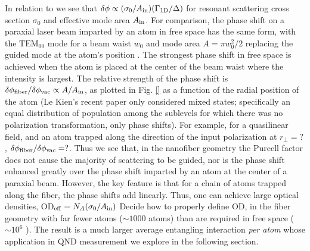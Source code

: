\documentclass[preprint,aps,pra,onecolumn]{revtex4-1} %
\newcommand{\oneD}{{\rm 1D}}
\newcommand{\vac}{{\rm vac}}
\newcommand{\inp}{{\rm in}}
\newcommand{\Ain}{A_{\rm in}}
\newcommand{\change}[1]{{\color{RoyalBlue} #1}}
\newcommand{\comment}[1]{{\color{Maroon} #1}}
\newcommand{\error}[1]{{\color{red} #1}}
\begin{document}
\change{
In relation to  we see that $\delta \phi \propto (\sigma_0/A_{\rm in}) (\Gamma_{\oneD}/\Delta)$ for resonant scattering cross section $\sigma_0$ and effective mode area $A_\inp$. For comparison, the phase shift on a paraxial laser beam imparted by an atom in free space has the same form, with the $\mathrm{TEM}_{00}$ mode for a beam waist $w_0$ and mode area $A= \pi w_0^2/2$ replacing the guided mode at the atom's position  \cite{tanji-suzuki_chapter_2011, baragiola_three-dimensional_2014}. The strongest phase shift in free space is achieved when the atom is placed at the center of the beam waist where the intensity is largest. The relative strength of the phase shift is $\delta \phi_{\rm fiber}/\delta \phi_{\vac}\propto A/A_{\rm in}$, as plotted in Fig. \ref{} as a function of the radial position of the atom \comment{(Le Kien's recent paper only considered mixed states; specifically an equal distribution of population among the sublevels for which there was no polarization transformation, only phase shifts)}.  For example, for a quasilinear field, and an atom trapped along the direction of the input polarization  at $r_\perp = ?$, $\delta \phi_{\rm fiber}/\delta \phi_{\vac} = ?$.   Thus we see that, in the nanofiber geometry the Purcell factor does not cause the majority of scattering to be guided, nor is the phase shift enhanced greatly over the phase shift imparted by an atom at the center of a paraxial beam. However, the key feature is that for a chain of atoms trapped along the fiber, the phase shifts add linearly.  Thus, one can achieve large optical densities, OD$_{\rm eff} = N_A (\sigma_0/\Ain)$ \comment{Decide how to properly define OD}, in the fiber geometry with far fewer atoms ($\sim 1000$ atoms) than are required in free space (\error{ $\sim 10^6$ }).  The result is a much larger average entangling interaction \emph{per atom} whose application in QND measurement we explore in the following section.
}
\end{document}
